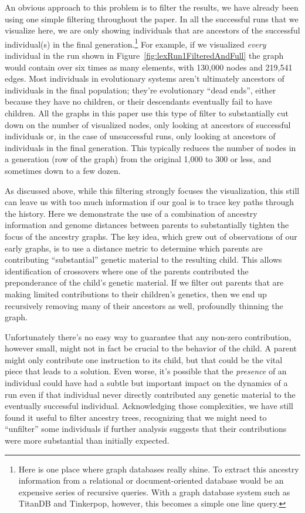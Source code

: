 \documentclass{sig-alternate}
\begin{document}
An obvious approach to this problem is to filter the results, we have
already been using one simple filtering throughout the paper. In all the
successful runs that we visualize here, we are only showing individuals that are
ancestors of the successful individual(s) in the final generation.\footnote{Here
	is one place where graph databases really shine. To extract this ancestry
	information from a relational or document-oriented database would be an
	expensive series of recursive queries. With a graph database system such as
	TitanDB and Tinkerpop, however, this becomes a simple one line query.} For example, if we
visualized \emph{every} individual in the run shown in
Figure~\ref{fig:lexRun1FilteredAndFull} the graph would contain
 over six times as many elements, with 130,000 nodes and 219,541
edges. Most individuals in evolutionary systems aren't ultimately ancestors of
individuals in the final population; they're evolutionary ``dead ends'', either
because they have no children, or their descendants eventually fail to have
children. All the graphs in this paper use this type of filter to substantially
cut down on the number of visualized nodes, only looking at ancestors of
successful individuals or, in the case of unsuccessful runs, only looking at
ancestors of individuals in the final generation. This typically reduces the
number of nodes in a generation (row of the graph) from the original 1,000 to
300 or less, and sometimes down to a few dozen.

As discussed above, while this filtering strongly focuses the visualization,
this still can leave us with too much information if our goal is to trace key
paths through the history. Here we demonstrate the use of a combination of 
ancestry information and genome distances between parents to substantially 
tighten the focus of the ancestry graphs. The key idea, which grew out of 
observations of our early graphs, is to use a distance metric to determine 
which parents are contributing ``substantial'' genetic material to the 
resulting child. This allows identification of crossovers where one of the parents contributed the 
preponderance of the child's genetic material. If we filter out parents that 
are making limited contributions to their children's genetics, then we end up
recursively removing many of their ancestors as well, profoundly thinning the
graph.

Unfortunately there's no easy way to guarantee that any non-zero contribution, 
however small, might not in fact be crucial to the behavior of the child. A 
parent might only contribute one instruction to its child, but that could be 
the vital piece that leads to a solution. Even worse, it's possible that the
\emph{presence} of an individual could have had a subtle but important impact 
on the dynamics of a run even if that individual never directly contributed any 
genetic material to the eventually successful individual. Acknowledging those
complexities, we have still found it useful to filter ancestry trees, 
recognizing that we might need to ``unfilter'' some individuals if further
analysis suggests that their contributions were more substantial than initially
expected.
\end{document}
